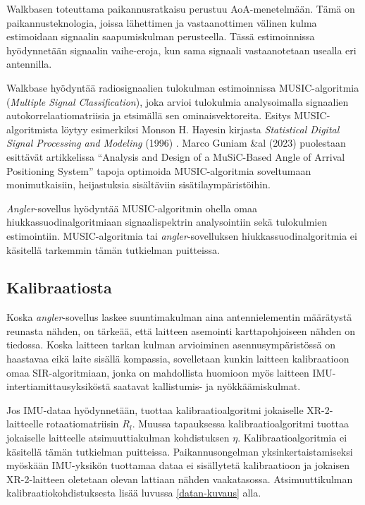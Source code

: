 \documentclass[
  12pt,
  a4paper, twoside]{book}
\begin{document}
Walkbasen toteuttama paikannusratkaisu perustuu AoA-menetelmään. Tämä on paikannusteknologia, joissa lähettimen ja vastaanottimen välinen kulma estimoidaan signaalin saapumiskulman perusteella. Tässä estimoinnissa hyödynnetään signaalin vaihe-eroja, kun sama signaali vastaanotetaan usealla eri antennilla.

Walkbase hyödyntää radiosignaalien tulokulman estimoinnissa MUSIC-algoritmia (\emph{Multiple Signal Classification}), joka arvioi tulokulmia analysoimalla signaalien autokorrelaatiomatriisia ja etsimällä sen ominaisvektoreita. Esitys MUSIC-algoritmista löytyy esimerkiksi Monson H. Hayesin kirjasta \emph{Statistical Digital Signal Processing and Modeling} (1996) \citep{Hayes-1996}. Marco Guniam \&al (2023) \citep{Gunia-2023} puolestaan esittävät artikkelissa ``Analysis and Design of a MuSiC-Based Angle of Arrival Positioning System'' tapoja optimoida MUSIC-algoritmia soveltumaan monimutkaisiin, heijastuksia sisältäviin sisätilaympäristöihin.

\emph{Angler}-sovellus hyödyntää MUSIC-algoritmin ohella omaa hiukkassuodinalgoritmiaan signaalispektrin analysointiin sekä tulokulmien estimointiin. MUSIC-algoritmia tai \emph{angler}-sovelluksen hiukkassuodinalgoritmia ei käsitellä tarkemmin tämän tutkielman puitteissa.

\subsection{Kalibraatiosta}

Koska \emph{angler}-sovellus laskee suuntimakulman aina antennielementin määrätystä reunasta nähden, on tärkeää, että laitteen asemointi karttapohjoiseen nähden on tiedossa. Koska laitteen tarkan kulman arvioiminen asennusympäristössä on haastavaa eikä laite sisällä kompassia, sovelletaan kunkin laitteen kalibraatioon omaa SIR-algoritmiaan, jonka on mahdollista huomioon myös laitteen IMU-intertiamittausyksiköstä saatavat kallistumis- ja nyökkäämiskulmat.

Jos IMU-dataa hyödynnetään, tuottaa kalibraatioalgoritmi jokaiselle XR-2-laitteelle rotaatiomatriisin \(R_l\). Muussa tapauksessa kalibraatioalgoritmi tuottaa jokaiselle laitteelle atsimuuttiakulman kohdistuksen \(\eta\). Kalibraatioalgoritmia ei käsitellä tämän tutkielman puitteissa. Paikannusongelman yksinkertaistamiseksi myöskään IMU-yksikön tuottamaa dataa ei sisällytetä kalibraatioon ja jokaisen XR-2-laitteen oletetaan olevan lattiaan nähden vaakatasossa. Atsimuuttikulman kalibraatiokohdistuksesta lisää luvussa \ref{datan-kuvaus} alla.
\end{document}
